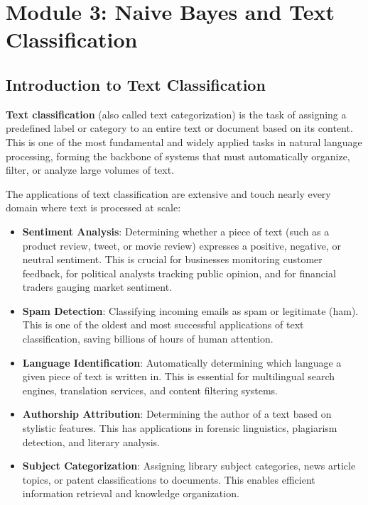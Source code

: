 \documentclass[11pt,a4paper]{article}
\begin{document}
\newpage

\section{Module 3: Naive Bayes and Text Classification}

\subsection{Introduction to Text Classification}

\textbf{Text classification} (also called text categorization) is the task of assigning a predefined label or category to an entire text or document based on its content. This is one of the most fundamental and widely applied tasks in natural language processing, forming the backbone of systems that must automatically organize, filter, or analyze large volumes of text.

The applications of text classification are extensive and touch nearly every domain where text is processed at scale:
\begin{itemize}
    \item \textbf{Sentiment Analysis}: Determining whether a piece of text (such as a product review, tweet, or movie review) expresses a positive, negative, or neutral sentiment. This is crucial for businesses monitoring customer feedback, for political analysts tracking public opinion, and for financial traders gauging market sentiment.
    \item \textbf{Spam Detection}: Classifying incoming emails as spam or legitimate (ham). This is one of the oldest and most successful applications of text classification, saving billions of hours of human attention.
    \item \textbf{Language Identification}: Automatically determining which language a given piece of text is written in. This is essential for multilingual search engines, translation services, and content filtering systems.
    \item \textbf{Authorship Attribution}: Determining the author of a text based on stylistic features. This has applications in forensic linguistics, plagiarism detection, and literary analysis.
    \item \textbf{Subject Categorization}: Assigning library subject categories, news article topics, or patent classifications to documents. This enables efficient information retrieval and knowledge organization.
\end{itemize}
\end{document}

